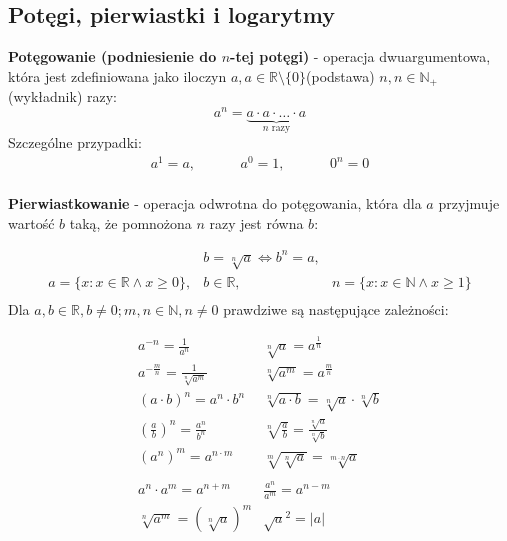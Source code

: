 \documentclass[14pt,a4paper]{extarticle}
\begin{document}
\subsection{Potęgi, pierwiastki i logarytmy}
\textbf{Potęgowanie (podniesienie do $n$-tej potęgi)} - operacja dwuargumentowa, która jest zdefiniowana jako iloczyn $a, a \in \mathbb{R}\setminus\{0\}$(podstawa) $n, n \in \mathbb{N}_{+}$(wykładnik) razy:\
$$a^{n} = \underbrace{a\cdot a \cdot\ldots\cdot a}_{n\text{ razy}}$$
Szczególne przypadki:
\begin{equation*}
\begin{array}{ccc}
   a^{1} = a, &\hspace{1cm} a^{0} = 1, &\hspace{1cm} 0^{n} = 0 \\ 
\end{array}
\end{equation*}

\renewcommand{\arraycolsep}{0cm}
\renewcommand{\arraystretch}{2}


\noindent\textbf{Pierwiastkowanie} - operacja odwrotna do potęgowania, która dla $a$ przyjmuje wartość $b$ taką, że pomnożona $n$ razy jest równa $b$:

\begin{equation*}
\begin{array}{ccc}
    & b = \sqrt[n]{a} \Leftrightarrow b^{n} = a, & \\
   a=\{x:x\in\mathbb{R}\land x\geq 0\}, & b\in\mathbb{R}, & n=\{x:x\in\mathbb{N}\land x\geq 1\} \\
\end{array}
\end{equation*}
\noindent Dla $a,b \in \mathbb{R}, b \neq 0; m,n \in \mathbb{N}, n \neq 0 $ prawdziwe są następujące zależności:

\renewcommand{\arraycolsep}{1cm}
\renewcommand{\arraystretch}{2}

\begin{equation*}
\begin{array}{ll}
   a^{-n} = \frac{\displaystyle 1}{\displaystyle a^{n}} & \sqrt[n]{a} = a^{\frac{1}{n}} \\
   a^{-\frac{m}{n}} = \frac{\displaystyle 1}{ \sqrt[n]{\displaystyle a^{m}}} & \sqrt[n]{a^{m}} = a^{\frac{m}{n}}\\
   (a\cdot b)^{n} = a^{n}\cdot b^{n} & \sqrt[n]{a\cdot b} = \sqrt[n]{a} \cdot \sqrt[n]{b} \\
   \left(\frac{\displaystyle a}{\displaystyle b}\right)^{n} = \frac{\displaystyle a^{n}}{\displaystyle b^{n}} & \sqrt[n]{\frac{\displaystyle a}{\displaystyle b}} = \frac{\displaystyle \sqrt[n]{a}}{\displaystyle \sqrt[n]{b}} \\
   (a^{n})^{m} = a^{n\cdot m} & \sqrt[m]{\sqrt[n]{a}} = \sqrt[m\cdot n]{a}\\
   \\
   a^{n}\cdot a^{m} = a^{n+m} & \frac{\displaystyle a^{n}}{\displaystyle a^{m}} = a^{n - m} \\
   \sqrt[n]{a^{m}} = (\sqrt[n]{a})^{m} &  \sqrt{a}^{2} = \lvert a\rvert \\
\end{array}
\end{equation*}
\\
\end{document}
